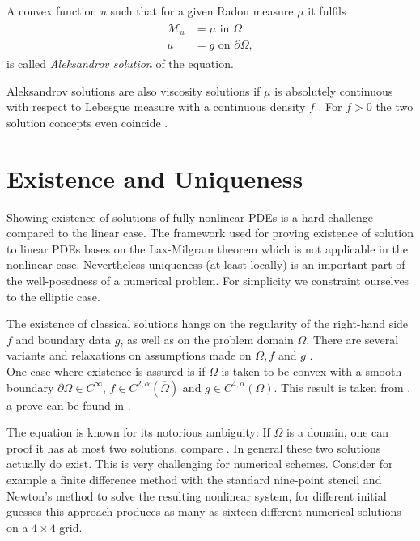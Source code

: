 \begin{definition}\label{def:aleksandrov solution}
A convex function $u$ such that for a given Radon measure $\mu$ it fulfils
\begin{align}
\begin{split}
\mathcal M_u&= \mu \text{ in } \Omega\\ 
u &= g  \text{ on } \partial \Omega,
\end{split}
\end{align}
is called \emph{Aleksandrov solution} of the \MA equation.
\end{definition}

Aleksandrov solutions are also viscosity solutions if $\mu$ is absolutely continuous with respect to Lebesgue measure with a continuous density $f$ \cite[Proposition 1.3.4.]{Gutierrez2001} . For $f > 0$ the two solution concepts even coincide \cite[Proposition 1.7.1]{Gutierrez2001}. 

\section{Existence and Uniqueness} \label{sec: Existence and Uniqueness}
Showing existence of solutions of fully nonlinear PDEs is a hard challenge compared to the linear case. The framework used for proving existence of solution to linear PDEs bases on the Lax-Milgram theorem which is not applicable in the nonlinear case. Nevertheless uniqueness (at least locally) is an important part of the well-posedness of a numerical problem. 
For simplicity we constraint ourselves to the elliptic case. 

The existence of classical solutions hangs on the regularity of the right-hand side $f$ and boundary data $g$, as well as on the problem domain $\Omega$. There are several variants and relaxations on assumptions made on $\Omega,f$ and $g$ \cite{Gutierrez2001, GT1983, Urbas1998}. \\
One case where existence is assured is if $\Omega$ is taken to be convex with a smooth boundary $\partial \Omega \in C^\infty$, $f \in C^{2,\alpha}(\overline \Omega)$ and $g \in C^{4,\alpha}(\Omega)$. This result is taken from \cite[p.357]{Neilan2014}, a prove can be found in \cite{Gutierrez2001}.

The \MA equation is known for its notorious ambiguity: If $\Omega$ is a domain, one can proof it has at most two solutions, compare \cite[Kap.IV, \S 5,3]{CH1968}. In general these two solutions actually do exist.
This is very challenging for numerical schemes. Consider for example a finite difference method with the standard nine-point stencil and Newton's method to solve the resulting nonlinear system, for different initial guesses this approach produces as many as sixteen different numerical solutions on a $4 \times 4$ grid\cite{FGN2013}. 

